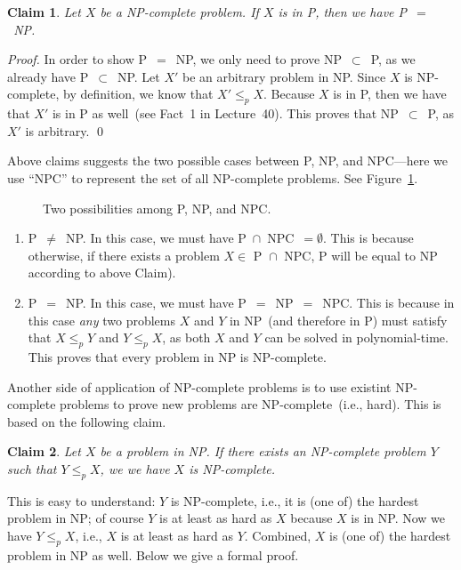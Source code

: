 \documentclass[letterpaper,11pt]{article}
\theoremstyle{mytheorem}
\newtheorem{claim}{Claim}
\begin{document}
\begin{claim}
Let $X$ be a NP-complete problem. If $X$ is in P, then we have P{}~$=${}~NP.
\end{claim}

\emph{Proof.} 	
In order to show P{}~$=${}~NP, we only need to prove NP{}~$\subset${}~P, as we already have P{}~$\subset${}~NP. 
Let $X'$ be an arbitrary problem in NP.  
Since $X$ is NP-complete, by definition, we know that $X'\le_p X$. Because
$X$ is in P, then we have that $X'$ is in P as well~(see Fact~1 in Lecture~40).
This proves that NP{}~$\subset${}~P, as $X'$ is arbitrary.  \qed

Above claims suggests the two possible cases between P, NP, and NPC---here we use ``NPC''
to represent the set of all NP-complete problems. See Figure~\ref{fig:PvsNP}.

\begin{figure}[!h]
\centering{}
\caption{Two possibilities among P, NP, and NPC.}
\label{fig:PvsNP}
\end{figure}

\vspace*{-\topsep}
\begin{enumerate}
\item P{}~$\neq${}~NP. In this case, we must have P{}~$\cap${}~NPC{}~$=\emptyset$. This is
because otherwise, if there exists a problem $X\in \textrm{ P } \cap \textrm{ NPC}$, P will be equal to NP according to above Claim). 
\item P{}~$=${}~NP. In this case, we must have P{}~$=${}~NP{}~$=${}~NPC. 
This is because in this case \emph{any} two problems $X$ and $Y$ in NP~(and therefore in P)
must satisfy that $X\le_p Y$ and $Y\le_p X$, as both $X$ and $Y$ can be solved in polynomial-time.
This proves that every problem in NP is NP-complete.
\end{enumerate}

Another side of application of NP-complete problems is to use existint NP-complete problems
to prove new problems are NP-complete~(i.e., hard). This is based on the following claim.

\begin{claim}
Let $X$ be a problem in NP. If there exists an NP-complete problem $Y$ such that $Y\le_p X$,
we we have $X$ is NP-complete.
\end{claim}

This is easy to understand: $Y$ is NP-complete, i.e., it is (one of) the hardest problem
in NP; of course $Y$ is at least as hard as $X$ because $X$ is in NP.
Now we have $Y\le_p X$, i.e., $X$ is at least as hard as $Y$. Combined, $X$ is (one of) the
hardest problem in NP as well. Below we give a formal proof.
\end{document}
